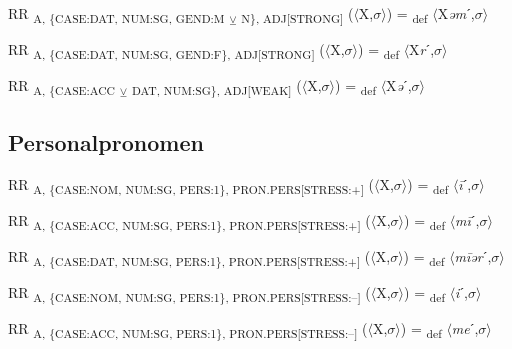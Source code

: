 {\begin{exe}
 RR \textsubscript{A, \{CASE:DAT, NUM:SG, GEND:M} \textsubscript{${\veebar}$}\textsubscript{ N\}, ADJ[STRONG]} ($\langle$X,$\sigma $$\rangle$) = \textsubscript{def} $\langle$X\textit{əm}ˊ,$\sigma $$\rangle$
\end{exe}

\begin{exe}
 RR \textsubscript{A, \{CASE:DAT, NUM:SG, GEND:F\}, ADJ[STRONG]} ($\langle$X,$\sigma $$\rangle$) = \textsubscript{def} $\langle$X\textit{r}ˊ,$\sigma $$\rangle$
\end{exe}

\begin{exe}
 RR \textsubscript{A, \{CASE:ACC} \textsubscript{${\veebar}$}\textsubscript{ DAT, NUM:SG\}, ADJ[WEAK]} ($\langle$X,$\sigma $$\rangle$) = \textsubscript{def} $\langle$X\textit{ə}ˊ,$\sigma $$\rangle$
\end{exe}

\subsection{Personalpronomen}

\begin{exe}
 RR \textsubscript{A, \{CASE:NOM, NUM:SG, PERS:1\}, PRON.PERS[STRESS:+]} ($\langle$X,$\sigma $$\rangle$) = \textsubscript{def} $\langle$\textit{\=i}ˊ,$\sigma $$\rangle$
\end{exe}

\begin{exe}
 RR \textsubscript{A, \{CASE:ACC, NUM:SG, PERS:1\}, PRON.PERS[STRESS:+]} ($\langle$X,$\sigma $$\rangle$) = \textsubscript{def} $\langle$\textit{m\=i}ˊ,$\sigma $$\rangle$
\end{exe}

\begin{exe}
 RR \textsubscript{A, \{CASE:DAT, NUM:SG, PERS:1\}, PRON.PERS[STRESS:+]} ($\langle$X,$\sigma $$\rangle$) = \textsubscript{def} $\langle$\textit{m\=iər}ˊ,$\sigma $$\rangle$
\end{exe}

\begin{exe}
 RR \textsubscript{A, \{CASE:NOM, NUM:SG, PERS:1\}, PRON.PERS[STRESS:–]} ($\langle$X,$\sigma $$\rangle$) = \textsubscript{def} $\langle$\textit{i}ˊ,$\sigma $$\rangle$
\end{exe}

\begin{exe}
 RR \textsubscript{A, \{CASE:ACC, NUM:SG, PERS:1\}, PRON.PERS[STRESS:–]} ($\langle$X,$\sigma $$\rangle$) = \textsubscript{def} $\langle$\textit{me}ˊ,$\sigma $$\rangle$
\end{exe}

}
